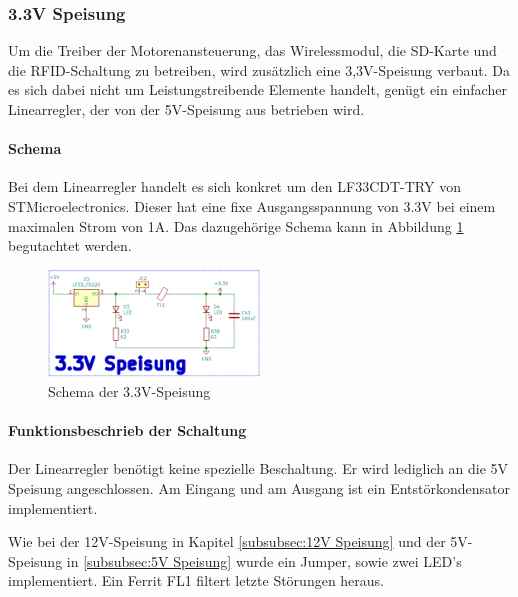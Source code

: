 \subsubsection{3.3V Speisung}
\label{subsubsec:3.3V Speisung}

Um die Treiber der Motorenansteuerung, das Wirelessmodul, die SD-Karte und die RFID-Schaltung zu betreiben, wird zusätzlich eine 3,3V-Speisung verbaut. Da es sich dabei nicht um  Leistungstreibende Elemente handelt, genügt ein einfacher Linearregler, der von der 5V-Speisung aus betrieben wird. 

\paragraph{Schema}\mbox{}

Bei dem Linearregler handelt es sich konkret um den LF33CDT-TRY von STMicroelectronics. Dieser hat eine fixe Ausgangsspannung von 3.3V bei einem maximalen Strom von 1A. Das dazugehörige Schema kann in Abbildung \ref{fig:Schema_Speisung_3.3V} begutachtet werden.

\begin{figure}[h!]
	\centering
	\includegraphics[width=0.5\textwidth]{graphics/Schema_Speisung_3,3V.png}
	\caption{Schema der 3.3V-Speisung}
	\label{fig:Schema_Speisung_3.3V}
\end{figure} 


\paragraph{Funktionsbeschrieb der Schaltung}\mbox{}

Der Linearregler benötigt keine spezielle Beschaltung. Er wird lediglich an die 5V Speisung angeschlossen. Am Eingang und am Ausgang ist ein Entstörkondensator implementiert. 

Wie bei der 12V-Speisung in Kapitel \ref{subsubsec:12V Speisung} und der 5V-Speisung in \ref{subsubsec:5V Speisung} wurde ein Jumper, sowie zwei LED's implementiert. Ein Ferrit FL1 filtert letzte Störungen heraus.
